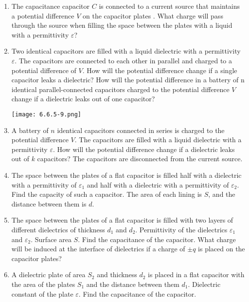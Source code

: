 \documentclass{article}
\begin{document}
\begin{enumerate}[label=6.6.\arabic*]
\item The capacitance capacitor $C$ is connected to a current source that maintains a potential difference $V$ on the capacitor plates . What charge will pass through the source when filling the space between the plates with a liquid with a permittivity $\varepsilon$?

\item Two identical capacitors are filled with a liquid dielectric with a permittivity $\varepsilon$. The capacitors are connected to each other in parallel and charged to a potential difference of $V$. How will the potential difference change if a single capacitor leaks a dielectric? How will the potential difference in a battery of n identical parallel-connected capacitors charged to the potential difference $V$ change if a dielectric leaks out of one capacitor?

\begin{center}
    \texttt{[image: 6.6.5-9.png]}
\end{center}

\item A battery of $n$ identical capacitors connected in series is charged to the potential difference $V$. The capacitors are filled with a liquid dielectric with a permittivity $\varepsilon$. How will the potential difference change if a dielectric leaks out of $k$ capacitors? The capacitors are disconnected from the current source.

\item The space between the plates of a flat capacitor is filled half with a dielectric with a permittivity of $\varepsilon_1$ and half with a dielectric with a permittivity of $\varepsilon_2$. Find the capacity of such a capacitor. The area of each lining is $S$, and the distance between them is $d$.

\item The space between the plates of a flat capacitor is filled with two layers of different dielectrics of thickness $d_1$ and $d_2$. Permittivity of the dielectrics $\varepsilon_1$ and $\varepsilon_2$. Surface area $S$. Find the capacitance of the capacitor. What charge will be induced at the interface of dielectrics if a charge of $\pm q$ is placed on the capacitor plates?

\item A dielectric plate of area $S_2$ and thickness $d_2$ is placed in a flat capacitor with the area of the plates $S_1$ and the distance between them $d_1$. Dielectric constant of the plate $\varepsilon$. Find the capacitance of the capacitor.


\end{enumerate}
\end{document}
